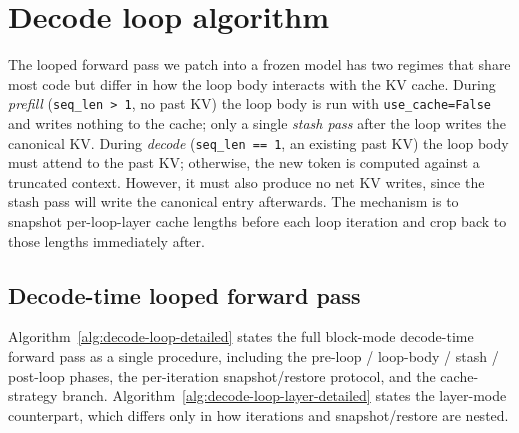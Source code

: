 \section{Decode loop algorithm}
\label{app:decode-loop}

The looped forward pass we patch into a frozen model has two regimes that share most code but differ in how the loop body interacts with the KV cache. During \emph{prefill} (\texttt{seq\_len > 1}, no past KV) the loop body is run with \texttt{use\_cache=False} and writes nothing to the cache; only a single \emph{stash pass} after the loop writes the canonical KV. During \emph{decode} (\texttt{seq\_len == 1}, an existing past KV) the loop body must attend to the past KV; otherwise, the new token is computed against a truncated context. However, it must also produce no net KV writes, since the stash pass will write the canonical entry afterwards. The mechanism is to snapshot per-loop-layer cache lengths before each loop iteration and crop back to those lengths immediately after.

\subsection{Decode-time looped forward pass}
\label{app:decode-algo-detailed}

Algorithm~\ref{alg:decode-loop-detailed} states the full block-mode decode-time forward pass as a single procedure, including the pre-loop / loop-body / stash / post-loop phases, the per-iteration snapshot/restore protocol, and the cache-strategy branch. Algorithm~\ref{alg:decode-loop-layer-detailed} states the layer-mode counterpart, which differs only in how iterations and snapshot/restore are nested.

